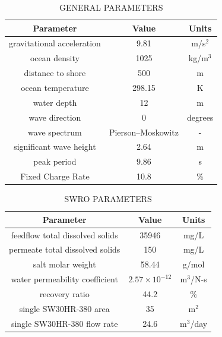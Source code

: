 \documentclass[twocolumn,10pt]{asme2e}
\begin{document}
\begin{table}[h]
    \centering
    \caption{GENERAL PARAMETERS}
    \begin{tabular}{ccc}
        \hline
        \textbf{Parameter} & \textbf{Value} & \textbf{Units} \\
        \hline
        gravitational acceleration & 9.81 & m/s$^2$ \\
        ocean density & 1025 & kg/m$^3$ \\
        distance to shore & 500 & m \\
        ocean temperature & 298.15 & K \\
        water depth & 12 & m \\
        wave direction & 0 \cite{Yu2018} & degrees \\
        
        wave spectrum & Pierson–Moskowitz \cite{Yu2018} & -  \\
        significant wave height & 2.64 \cite{Yu2018} & m \\
        peak period & 9.86 \cite{Yu2018} & s \\

        Fixed Charge Rate & 10.8 \cite{LCOE_DOE} & \% \\
        \hline
    \end{tabular}
    \label{tab:paramsgeneral}
\end{table}


\begin{table}[h]
    \centering
    \caption{SWRO PARAMETERS}
    \begin{tabular}{ccc}
        \hline
        \textbf{Parameter} & \textbf{Value} & \textbf{Units} \\
        \hline
        feedflow total dissolved solids & 35946 \cite{Yu2018} & mg/L \\
        permeate total dissolved solids & 150 \cite{Yu2018} & mg/L \\
        salt molar weight & 58.44 & g/mol \\
        water permeability coefficient & $2.57\times10^{-12}$ \cite{Yu2018} & m$^3$/N-s \\
        recovery ratio & 44.2 \cite{wave} & \% \\
        single SW30HR-380 area & 35 \cite{SW30HR380} & m$^2$ \\
        single SW30HR-380 flow rate & 24.6 \cite{SW30HR380} & m$^3$/day \\
        \hline
    \end{tabular}
    \label{tab:paramsswro}
\end{table}
\end{document}
